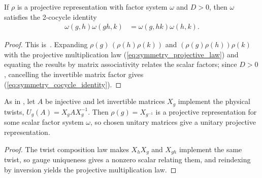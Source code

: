 \begin{lemma}%
    \label{lem:cocycle_of_assoc}
    \leanok
    If $\rho$ is a projective representation with factor system $\omega$
    and $D > 0$, then $\omega$ satisfies the 2-cocycle identity
    \begin{align}
        \omega(g,h) \omega(gh,k)
         & =\omega(g,hk) \omega(h,k).
        \label{eq:symmetry_cocycle_identity}
    \end{align}
\end{lemma}

\begin{proof}\leanok{}
    This is~\cite[``Associativity forces the cocycle
        condition'']{QICLean2026Blueprint}.
    Expanding $\rho(g)\,(\rho(h)\rho(k))$ and
    $(\rho(g)\rho(h))\rho(k)$ with the projective multiplication law
    (\ref{eq:symmetry_projective_law}) and equating the results by matrix
    associativity relates the scalar factors; since $D > 0$, cancelling the
    invertible matrix factor gives (\ref{eq:symmetry_cocycle_identity}).
\end{proof}

\begin{lemma}
    \label{lem:projective_rep_from_virtual_covariance}
    \leanok
    As in \cite[Section~II.F.2]{Schuch2011Phases}, let $A$ be injective and
    let invertible matrices $X_g$ implement the physical twists,
    $U_g(A)=X_g A X_g^{-1}$. Then $\rho(g)=X_{g^{-1}}$ is a projective
    representation for some scalar factor system $\omega$, so chosen unitary
    matrices give a unitary projective representation.
\end{lemma}

\begin{proof}\leanok
    The twist composition law makes $X_hX_g$ and $X_{gh}$ implement the same
    twist, so gauge uniqueness gives a nonzero scalar relating them, and
    reindexing by inversion yields the projective multiplication law.
\end{proof}

